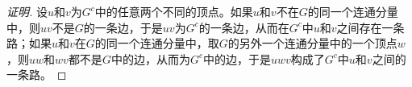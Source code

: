 \begin{proof}[证明]
  设$u$和$v$为$G^c$中的任意两个不同的顶点。如果$u$和$v$不在$G$的同一个连通分量中，则$uv$不是$G$的一条边，于是$uv$为$G^c$的一条边，从而在$G^c$中$u$和$v$之间存在一条路；如果$u$和$v$在$G$的同一个连通分量中，取$G$的另外一个连通分量中的一个顶点$w$，则$uw$和$wv$都不是$G$中的边，从而为$G^c$中的边，于是$uwv$构成了$G^c$中$u$和$v$之间的一条路。
\end{proof}

